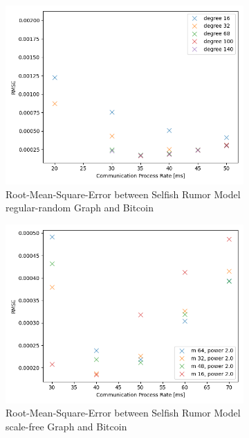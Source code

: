 \begin{figure}[h! t]
	 \begin{subfigure}[b]{0.48\textwidth}
		\includegraphics[width=\textwidth]{figures/RMSE_95.png}
		\caption{Root-Mean-Square-Error between Selfish Rumor Model regular-random Graph and Bitcoin}
		\label{fig:RMSE}
	\end{subfigure}
	\hfill
	\begin{subfigure}[b]{0.48\textwidth}
		\includegraphics[width=\textwidth]{figures/RMSE_95_barabasi.png}
		\caption{Root-Mean-Square-Error between Selfish Rumor Model scale-free Graph and Bitcoin}
		\label{fig:RMSEBar}
	\end{subfigure}
	\hfill
	\begin{subfigure}[b]{0.48\textwidth}

\end{subfigure}
\end{figure}
